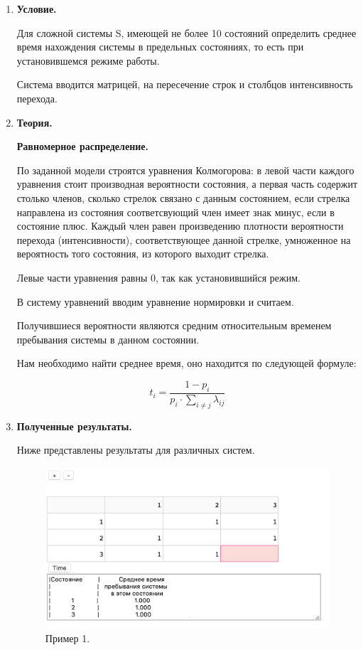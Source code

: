 \documentclass[a4paper,14pt]{extreport} %
\begin{document}
\begin{enumerate}

\item \textbf{Условие. }

Для сложной системы S, имеющей не более 10 состояний определить среднее время нахождения системы в предельных состояниях, то есть при установившемся режиме работы. 

Система вводится матрицей, на пересечение строк и столбцов интенсивность перехода. 

\item \textbf{Теория. }

\textbf{Равномерное распределение. }

По заданной модели строятся уравнения Колмогорова: в левой части каждого уравнения стоит производная вероятности состояния, а первая часть содержит столько членов, сколько стрелок связано с данным состоянием, если стрелка направлена из состояния соответсвующий член имеет знак минус, если в состояние плюс. Каждый член равен произведению плотности вероятности перехода (интенсивности), соответствующее данной стрелке, умноженное на вероятность того состояния, из которого выходит стрелка. 

Левые части уравнения равны 0, так как установившийся режим. 

В систему уравнений вводим уравнение нормировки и считаем. 

Получившиеся вероятности являются средним относительным временем пребывания системы в данном состоянии. 

Нам необходимо найти среднее время, оно находится по следующей формуле:

$$t_i=\frac{1-p_i}{p_i \cdot \sum_{i\ne j}^{}\lambda_{ij}}$$
 
\item \textbf{Полученные результаты. }

Ниже представлены результаты для различных систем. 

\begin{figure}[H]
  \centering
  \caption{Пример 1. }
  \includegraphics[scale=1]{1}
\end{figure}


\end{enumerate}
\end{document}
